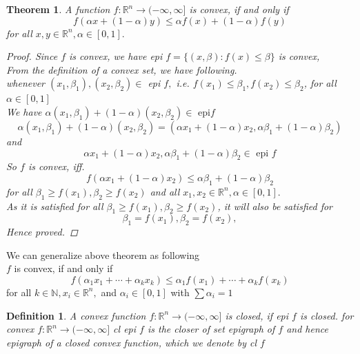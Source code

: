 \documentclass[oneside]{book}
\newtheorem{theorem}{Theorem}[section]
\newtheorem{mydef}{Definition}[section]
\begin{document}
	
	\begin{theorem}
		\label{t:7}
		A function $f: \mathbb{R}^{n} \rightarrow(-\infty, \infty]$ is convex, if and only if
		$$
		f(\alpha x+(1-\alpha) y) \leq \alpha f(x)+(1-\alpha) f(y)
		$$
		for all $x, y \in \mathbb{R}^{n}, \alpha \in[0,1].$
		\begin{proof}
			
			Since $f$ is convex, we have epi $f=\{(x, \beta): f(x) \leq \beta\}$ is convex,\\
			From the definition of a convex set, we have following. \\
			
			whenever $\left(x_{1}, \beta_{1}\right),\left(x_{2}, \beta_{2}\right) \in$ epi $f,$ i.e. $f\left(x_{1}\right) \leq \beta_{1}, f\left(x_{2}\right) \leq \beta_{2}$, for all $\alpha \in[0,1]$ \\
			We have
			$\alpha\left(x_{1}, \beta_{1}\right)+(1-\alpha)\left(x_{2}, \beta_{2}\right) \in \text{ epi} f$
			$$
			\alpha\left(x_{1}, \beta_{1}\right)+(1-\alpha)\left(x_{2}, \beta_{2}\right)=  \left(\alpha x_{1}+(1-\alpha) x_{2}, \alpha \beta_{1}+(1-\alpha) \beta_{2}\right)
			$$
			and  $$ \alpha x_{1}+(1-\alpha) x_{2}, \alpha \beta_{1}+(1-\alpha) \beta_{2} \in \text { epi } f $$
			So $f$ is convex, iff.
			$$
			f\left(\alpha x_{1}+(1-\alpha) x_{2}\right) \leq \alpha \beta_{1}+(1-\alpha) \beta_{2}
			$$
			for   all $ \beta_{1} \geq f\left(x_{1}\right), \beta_{2} \geq f\left(x_{2}\right) $ and  all $ x_{1}, x_{2} \in \mathbb{R}^{n}, \alpha \in[0,1].$ 
			\\
			
			As it is satisfied for all $ \beta_{1} \geq f\left(x_{1}\right), \beta_{2} \geq f\left(x_{2}\right) $, it will also be satisfied for
			$$\beta_{1}=f\left(x_{1}\right), \beta_{2}=f\left(x_{2}\right),$$
			Hence proved.  
		\end{proof}
	\end{theorem} 
	
	We can  generalize above theorem as following \\
	$f$ is convex, if and only if
	\begin{equation}
	\label{eq41}
	f\left(\alpha_{1} x_{1}+\cdots+\alpha_{k} x_{k}\right) \leq \alpha_{1} f\left(x_{1}\right)+\cdots+\alpha_{k} f\left(x_{k}\right)
	\end{equation}
	for all $k \in \mathbb{N}, x_{i} \in \mathbb{R}^{n},$ and $\alpha_{i} \in[0,1]$ with $\sum \alpha_{i}=1$
	
	
	
	\begin{mydef} \label{d:11}
		A convex function $f: \mathbb{R}^{n} \rightarrow(-\infty, \infty]$ is closed, if epi $f$ is closed.
		for convex  $f: \mathbb{R}^{n} \rightarrow(-\infty, \infty]$   cl epi $f$ is the closer of set epigraph of $f$ and hence epigraph of a closed convex function, which we denote by cl $f$
	\end{mydef}
	
\end{document}
